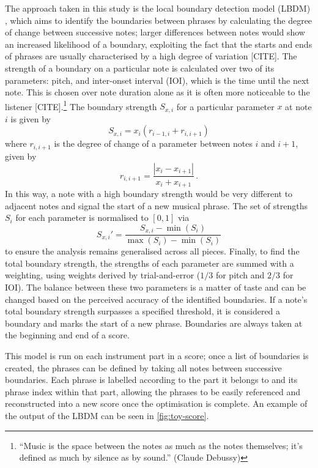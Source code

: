 \documentclass[12pt]{article}
\theoremstyle{definition}
\begin{document}
The approach taken in this study is the local boundary detection model (LBDM) \cite{cambouropoulos_lbdm_2011}, which aims to identify the boundaries between phrases by calculating the degree of change between successive notes; larger differences between notes would show an increased likelihood of a boundary, exploiting the fact that the starts and ends of phrases are usually characterised by a high degree of variation [CITE]. The strength of a boundary on a particular note is calculated over two of its parameters: pitch, and inter-onset interval (IOI), which is the time until the next note. This is chosen over note duration alone as it is often more noticeable to the listener [CITE].\footnote{``Music is the space between the notes as much as the notes themselves; it's defined as much by silence as by sound.'' (Claude Debussy)} The boundary strength $S_{x,i}$ for a particular parameter $x$ at note $i$ is given by
\begin{equation}
    S_{x,i}=x_i(r_{i-1, i} + r_{i, i+1})
    \label{eq:boundary-strength}
\end{equation}
where $r_{i, i+1}$ is the degree of change of a parameter between notes $i$ and $i+1$, given by
\begin{equation}
    r_{i, i+1}=\frac{|x_{i}-x_{i+1}|}{x_{i}+x_{i+1}} \,.
    \label{eq:degree-change}
\end{equation}
In this way, a note with a high boundary strength would be very different to adjacent notes and signal the start of a new musical phrase. The set of strengths $S_i$ for each parameter is normalised to $[0,1]$ via
\begin{equation}
    S_{x,i}'=\frac{S_{x,i}-\min(S_i)}{\max(S_i)-\min(S_i)}
    \label{eq:normalisation}
\end{equation}
to ensure the analysis remains generalised across all pieces.
Finally, to find the total boundary strength, the strengths of each parameter are summed with a weighting, using weights derived by trial-and-error ($1/3$ for pitch and $2/3$ for IOI). The balance between these two parameters is a matter of taste and can be changed based on the perceived accuracy of the identified boundaries. If a note's total boundary strength surpasses a specified threshold, it is considered a boundary and marks the start of a new phrase. Boundaries are always taken at the beginning and end of a score.

This model is run on each instrument part in a score; once a list of boundaries is created, the phrases can be defined by taking all notes between successive boundaries. Each phrase is labelled according to the part it belongs to and its phrase index within that part, allowing the phrases to be easily referenced and reconstructed into a new score once the optimisation is complete. An example of the output of the LBDM can be seen in \cref{fig:toy-score}.
\end{document}
